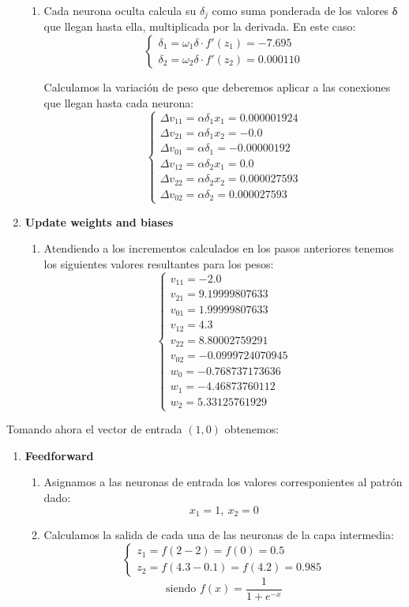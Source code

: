 \begin{problem}[6]
\begin{enumerate}
\begin{enumerate}
\item Cada neurona oculta calcula su $δ_j$ como suma ponderada de los valores δ que llegan hasta ella, multiplicada por la derivada. En este caso:
\[\left\{ \begin{array}{l}
δ_1= ω_1 δ \cdot f'(z_1)= -7.695\\
δ_2= ω_2 δ \cdot f'(z_2)= 0.000110
\end{array}\right.\]

Calculamos la variación de peso que deberemos aplicar a las conexiones que llegan hasta cada neurona:
\[\left\{ \begin{array}{l}
Δv_{11}= αδ_1x_1 = 0.000001924\\
Δv_{21}= αδ_1x_2 = -0.0\\
Δv_{01}= αδ_1    = -0.00000192\\
Δv_{12}= αδ_2x_1 = 0.0\\
Δv_{22}= αδ_2x_2 = 0.000027593\\
Δv_{02}= αδ_2    = 0.000027593
\end{array}\right.\]


\end{enumerate}
\item \textbf{Update weights and biases}
\begin{enumerate}
\item Atendiendo a los incrementos calculados en los pasos anteriores tenemos los siguientes valores resultantes para los pesos:
\[\left\{ \begin{array}{l}
v_{11} =    -2.0\\
v_{21} =    9.19999807633\\
v_{01} =    1.99999807633\\
v_{12} =    4.3\\
v_{22} =    8.80002759291\\
v_{02} =    -0.0999724070945\\
w_0     =  -0.768737173636\\
w_1     =  -4.46873760112\\
w_2     =  5.33125761929
\end{array}\right.\]

\end{enumerate}
\end{enumerate}

\spart

Tomando ahora el vector de entrada $(1,0)$ obtenemos:

\begin{enumerate}
\item \textbf{Feedforward}
\begin{enumerate}
\item Asignamos a las neuronas de entrada los valores corresponientes al patrón dado:
\[x_1 = 1, \ x_2 = 0\]
\item Calculamos la salida de cada una de las neuronas de la capa intermedia:
\[\left\{ \begin{array}{l}
z_1 = f(2-2) = f(0) = 0.5\\
z_2 = f(4.3-0.1) =f(4.2) = 0.985
\end{array}\right.\]
\[\text{siendo }f(x) = \frac{1}{1+e^{-x}}\]


\end{enumerate}
\end{enumerate}
\end{problem}
